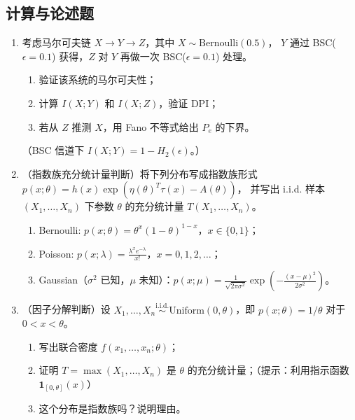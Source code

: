 \documentclass[12pt,a4paper]{ctexart}
\newcommand{\iid}{\overset{\text{i.i.d.}}{\sim}}
\begin{document}
\subsection*{计算与论述题}

\begin{enumerate}[label=\textbf{\arabic*.}, leftmargin=*]
\item 考虑马尔可夫链 $X \to Y \to Z$，其中 $X \sim \mathrm{Bernoulli}(0.5)$，
$Y$ 通过 BSC($\epsilon=0.1$) 获得，$Z$ 对 $Y$ 再做一次 BSC($\epsilon=0.1$) 处理。
\begin{enumerate}
  \item 验证该系统的马尔可夫性；
  \item 计算 $I(X;Y)$ 和 $I(X;Z)$，验证 DPI；
  \item 若从 $Z$ 推测 $X$，用 Fano 不等式给出 $P_e$ 的下界。
\end{enumerate}
（BSC 信道下 $I(X;Y) = 1 - H_2(\epsilon)$。）

\item （指数族充分统计量判断）将下列分布写成指数族形式 $p(x;\theta) = h(x)\exp(\eta(\theta)^T\tau(x) - A(\theta))$，
并写出 i.i.d. 样本 $(X_1,\ldots,X_n)$ 下参数 $\theta$ 的充分统计量 $T(X_1,\ldots,X_n)$。
\begin{enumerate}
  \item Bernoulli: $p(x;\theta) = \theta^x (1-\theta)^{1-x}$，$x\in\{0,1\}$；
  \item Poisson: $p(x;\lambda) = \frac{\lambda^x e^{-\lambda}}{x!}$，$x=0,1,2,\ldots$；
  \item Gaussian（$\sigma^2$ 已知，$\mu$ 未知）：$p(x;\mu) = \frac{1}{\sqrt{2\pi\sigma^2}}\exp(-\frac{(x-\mu)^2}{2\sigma^2})$。
\end{enumerate}

\item （因子分解判断）设 $X_1,\ldots,X_n \iid \mathrm{Uniform}(0,\theta)$，即 $p(x;\theta) = 1/\theta$ 对于 $0 < x < \theta$。
\begin{enumerate}
  \item 写出联合密度 $f(x_1,\ldots,x_n;\theta)$；
  \item 证明 $T = \max(X_1,\ldots,X_n)$ 是 $\theta$ 的充分统计量；（提示：利用指示函数 $\mathbf{1}_{[0,\theta]}(x)$）
  \item 这个分布是指数族吗？说明理由。
\end{enumerate}
\end{enumerate}

\newpage

\end{document}
